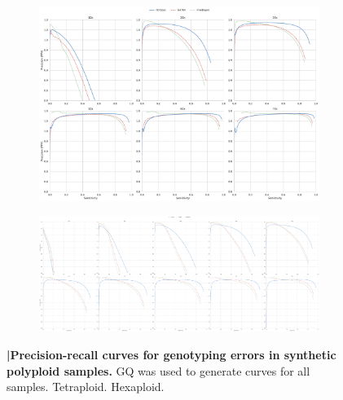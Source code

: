 \documentclass{article}
\begin{document}
\begin{figure}
    \centering
\captionsetup[subfigure]{position=top,labelfont=bf,textfont=normalfont,singlelinecheck=off,justification=raggedright}
    \begin{subfigure}[b]{\textwidth}
        \caption{}
        \includegraphics[width=\textwidth]{figures/synthetic-tetraploid-pr-curves}
        \label{fig:polyploid-genotyping-accuracy:tetraploid}
    \end{subfigure}
    \begin{subfigure}[b]{\textwidth}
        \caption{}
        \includegraphics[width=\textwidth]{figures/synthetic-hexaploid-pr-curves}
        \label{fig:polyploid-genotyping-accuracy:hexaploid}
    \end{subfigure}
     \caption{\textbf{|\:Precision-recall curves for genotyping errors in synthetic polyploid samples.} GQ was used to generate curves for all samples. \protect{} Tetraploid. \protect{} Hexaploid.}
    \label{supfig:polyploid_prs}
\end{figure}
\end{document}
